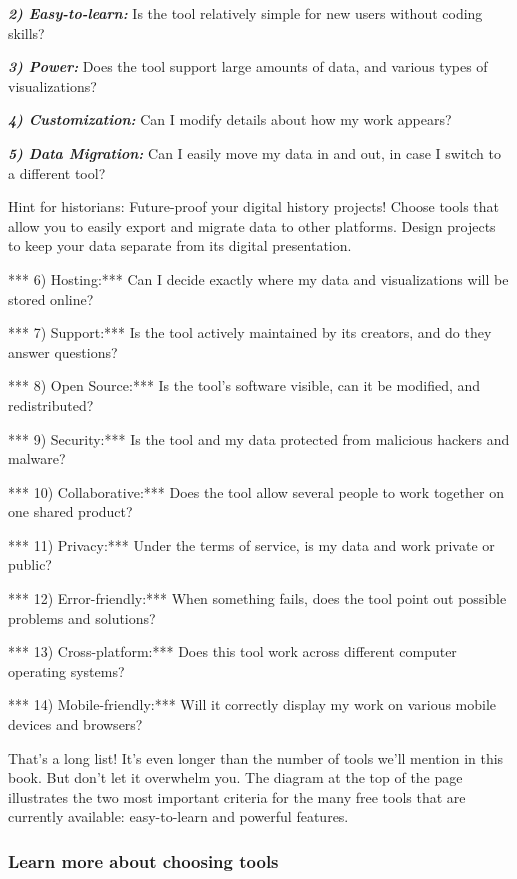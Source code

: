 \documentclass[
  english,
]{book}
\begin{document}
\textbf{\emph{2) Easy-to-learn:}} Is the tool relatively simple for new users without coding skills?

\textbf{\emph{3) Power:}} Does the tool support large amounts of data, and various types of visualizations?

\textbf{\emph{4) Customization:}} Can I modify details about how my work appears?

\textbf{\emph{5) Data Migration:}} Can I easily move my data in and out, in case I switch to a different tool?

Hint for historians: Future-proof your digital history projects! Choose tools that allow you to easily export and migrate data to other platforms. Design projects to keep your data separate from its digital presentation.

*** 6) Hosting:*** Can I decide exactly where my data and visualizations will be stored online?

*** 7) Support:*** Is the tool actively maintained by its creators, and do they answer questions?

*** 8) Open Source:*** Is the tool's software visible, can it be modified, and redistributed?

*** 9) Security:*** Is the tool and my data protected from malicious hackers and malware?

*** 10) Collaborative:*** Does the tool allow several people to work together on one shared product?

*** 11) Privacy:*** Under the terms of service, is my data and work private or public?

*** 12) Error-friendly:*** When something fails, does the tool point out possible problems and solutions?

*** 13) Cross-platform:*** Does this tool work across different computer operating systems?

*** 14) Mobile-friendly:*** Will it correctly display my work on various mobile devices and browsers?

That's a long list! It's even longer than the number of tools we'll mention in this book. But don't let it overwhelm you. The diagram at the top of the page illustrates the two most important criteria for the many free tools that are currently available: easy-to-learn and powerful features.

\hypertarget{learn-more-about-choosing-tools}{%
\subsubsection*{Learn more about choosing tools}\label{learn-more-about-choosing-tools}}
\end{document}
